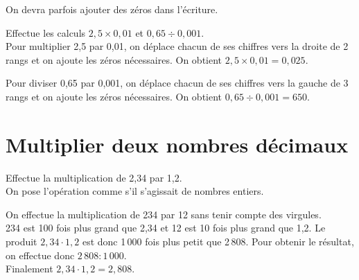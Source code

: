 \begin{remarque}
On devra parfois ajouter des zéros dans l'écriture.
\end{remarque}

\begin{exemple*1}
Effectue les calculs $2,5 \times 0,01$ et $0,65 \div 0,001$.\\[1em]
Pour multiplier 2,5 par 0,01, on déplace chacun de ses chiffres vers la droite de 2 rangs et on ajoute les zéros nécessaires. 
On obtient $2,5 \times 0,01 = 0,025$.

Pour diviser 0,65 par 0,001, on déplace chacun de ses chiffres vers la gauche de 3 rangs et on ajoute les zéros nécessaires. 
On obtient $0,65 \div 0,001 = 650$. 
\end{exemple*1}


\section{Multiplier deux nombres décimaux}

\begin{exemple*1}
Effectue la multiplication de 2,34 par 1,2.\\[1em]
On pose l'opération comme s'il s'agissait de nombres entiers. 

On effectue la multiplication de 234 par 12 sans tenir compte des virgules.\\[0.75em]
234 est 100 fois plus grand que 2,34 et 12 est 10 fois plus grand que 1,2. Le produit $2,34 \cdot 1,2$ est donc 1\,000 fois plus petit que 2\,808. Pour obtenir le résultat, on effectue donc $2\,808 : 1\,000$.\\[0.75em]
Finalement $2,34 \cdot 1,2 = 2,808$.
\end{exemple*1}

        
